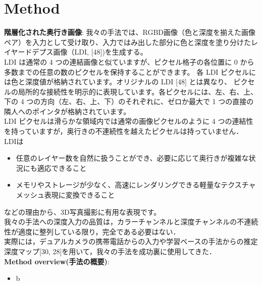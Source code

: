 \documentclass[a4paper,10pt,titlepage]{jsarticle}
\begin{document}
\section{Method}
\textbf{階層化された奥行き画像}:
我々の手法では、RGBD画像（色と深度を揃えた画像ペア）を入力として受け取り、入力ではみ出した部分に色と深度を塗り分けたレイヤードデプス画像（LDI, [48])を生成する。\\

LDI は通常の 4 つの連結画像と似ていますが、ピクセル格子の各位置に 0 から多数までの任意の数のピクセルを保持することができます。
各 LDI ピクセルには色と深度値が格納されています。オリジナルの LDI [48] とは異なり、 ピクセルの局所的な接続性を明示的に表現しています。各ピクセルには、左、右、上、下の 4 つの方向（左、右、上、下）のそれぞれに、ゼロか最大で 1 つの直接の隣人へのポインタが格納されています。\\

 LDI ピクセルは滑らかな領域内では通常の画像ピクセルのように 4 つの連結性を持っていますが，奥行きの不連続性を越えたピクセルは持っていません．\\

 LDIは
 \begin{itemize}
   \item 任意のレイヤー数を自然に扱うことができ、必要に応じて奥行きが複雑な状況にも適応できること
   \item メモリやストレージが少なく、高速にレンダリングできる軽量なテクスチャメッシュ表現に変換できること
 \end{itemize}
 などの理由から、3D写真撮影に有用な表現です。\\

 我々の手法への深度入力の品質は，カラーチャンネルと深度チャンネルの不連続性が適度に整列している限り，完全である必要はない．\\
実際には，デュアルカメラの携帯電話からの入力や学習ベースの手法からの推定深度マップ[30, 28]を用いて，我々の手法を成功裏に使用してきた．\\

\textbf{Method overview(手法の概要)}:



\begin{itemize}
  \item b
\end{itemize}


\begin{thebibliography}{99}
\end{thebibliography}
\end{document}
